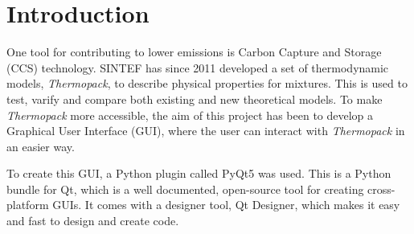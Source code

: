 \section{Introduction}

One tool for contributing to lower  emissions is Carbon Capture and Storage (CCS) technology. SINTEF has since 2011 developed a set of thermodynamic models, \textit{Thermopack}, to describe physical properties for  mixtures. This is used to test, varify and compare both existing and new theoretical models. To make \textit{Thermopack} more accessible, the aim of this project has been to develop a Graphical User Interface (GUI), where the user can interact with \textit{Thermopack} in an easier way.

To create this GUI, a Python plugin called PyQt5 was used. This is a Python bundle for Qt, which is a well documented, open-source tool for creating cross-platform GUIs. It comes with a designer tool, Qt Designer, which makes it easy and fast to design and create code.
